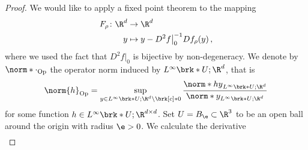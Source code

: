 \begin{proof}
  We would like to apply a fixed point theorem to the mapping
  \begin{align*}
    F_\rho\colon \R^d&\to\R^d \\
    y&\mapsto y -D^2f\big\vert_0^{-1}Df_\rho(y)\,,
  \end{align*}
  where we used the fact that $D^2f\big\vert_0$ is bijective by non-degeneracy.
  We denote by $\norm*{\cdot}_{\text{Op}}$ the operator norm induced by $L^\infty\brk*{U;\R^d}$, that is
  \begin{align*}
    \norm{h}_{\text{Op}}=\sup_{y\in L^\infty\brk*{U;\R^d}\setminus\brk[c]*{0}}\frac{\norm*{hy}_{L^\infty\brk*{U;\R^d}}}{\norm*{y}_{L^\infty\brk*{U;\R^d}}}
  \end{align*}
  for some function $h\in L^\infty\brk*{U;\R^{d\times d}}$.
  Set $U=B_\e\subset\R^3$ to be an open ball around the origin with radius $\e>0$.
  We calculate the derivative
  \begin{align*}

\end{align*}
\end{proof}
